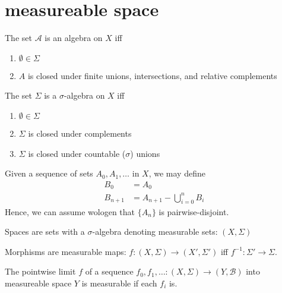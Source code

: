 \documentclass{scrartcl}
\newcommand{\wologen}{wologen\xspace}
\begin{document}
\section{measureable space}
\begin{defn}
  The set $\mathscr A$ is an algebra on $X$ iff 
  \begin{enumerate}
  \item $\emptyset\in\Sigma$
  \item $A$ is closed under finite unions, intersections, and relative complements
  \end{enumerate}
\end{defn}
\begin{defn}
  The set $\Sigma$ is a $\sigma$-algebra on $X$ iff
  \begin{enumerate}
  \item $\emptyset\in \Sigma$
  \item $\Sigma$ is closed under complements
  \item $\Sigma$ is closed under countable ($\sigma$) unions 
  \end{enumerate}
\end{defn}
\begin{note}
  Given a sequence of sets $A_0,A_1,\dots$ in $X$, we may define
  \begin{align*}
    B_0&=A_0 \\
    B_{n+1}&=A_{n+1}-\bigcup_{i=0}^n B_i 
  \end{align*}
  Hence, we can assume \wologen that $\{A_n\}$ is pairwise-disjoint. 
\end{note}
\begin{defcat}
  \begin{trivlist}
  \item Spaces are sets with a $\sigma$-algebra denoting measurable sets: $(X,\Sigma)$ 
  \item Morphisms are measurable maps: $f:(X,\Sigma)\to (X',\Sigma')$ iff $f^{-1}:\Sigma' \to \Sigma$. 
  \end{trivlist}
\end{defcat}
\begin{theorem}
  The pointwise limit $f$ of a sequence $f_0,f_1,\dots : (X,\Sigma)\to (Y,\mathscr B)$ into measureable space $Y$ is measurable if each $f_i$ is. 
\end{theorem}
\end{document}
